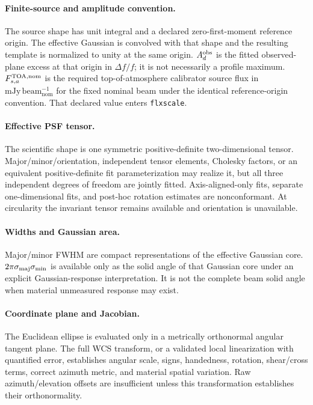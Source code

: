 \paragraph{Finite-source and amplitude convention.} The source shape has unit
integral and a declared zero-first-moment reference origin. The effective
Gaussian is convolved with that shape and the resulting template is normalized
to unity at the same origin. $A_d^{\rm obs}$ is the fitted observed-plane
excess at that origin in $\Delta f/f$; it is not necessarily a profile maximum.
$F^{\rm TOA,nom}_{s,a}$ is the required top-of-atmosphere calibrator source
flux in $\mathrm{mJy\,beam_{nom}^{-1}}$ for the fixed nominal beam under the
identical reference-origin convention. That declared value enters
\texttt{flxscale}.

\paragraph{Effective PSF tensor.} The scientific shape is one symmetric
positive-definite two-dimensional tensor. Major/minor/orientation, independent
tensor elements, Cholesky factors, or an equivalent positive-definite fit
parameterization may realize it, but all three independent degrees of freedom
are jointly fitted. Axis-aligned-only fits, separate one-dimensional fits, and
post-hoc rotation estimates are nonconformant. At circularity the invariant
tensor remains available and orientation is unavailable.

\paragraph{Widths and Gaussian area.} Major/minor FWHM are compact
representations of the effective Gaussian core. $2\pi\sigma_{\rm maj}
\sigma_{\rm min}$ is available only as the solid angle of that Gaussian core
under an explicit Gaussian-response interpretation. It is not the complete
beam solid angle when material unmeasured response may exist.

\paragraph{Coordinate plane and Jacobian.} The Euclidean ellipse is evaluated
only in a metrically orthonormal angular tangent plane. The full WCS transform,
or a validated local linearization with quantified error, establishes angular
scale, signs, handedness, rotation, shear/cross terms, correct azimuth metric,
and material spatial variation. Raw azimuth/elevation offsets are insufficient
unless this transformation establishes their orthonormality.

